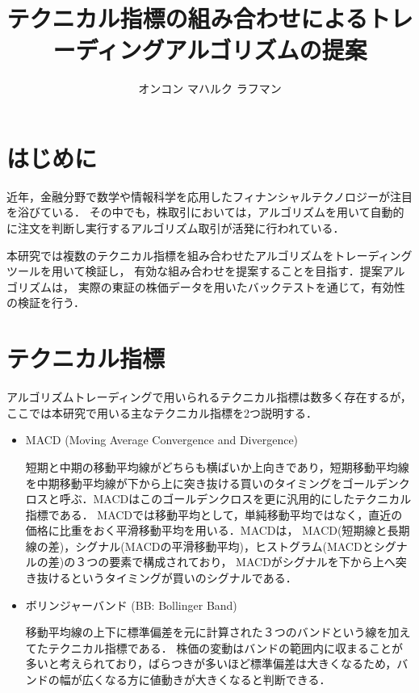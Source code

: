 \documentclass[dvipdfmx,a4paper,twocolumn,10pt]{jarticle}
\title{テクニカル指標の組み合わせによるトレーディングアルゴリズムの提案}%
\author{オンコン マハルク ラフマン}       %
\begin{document}
\maketitle

\section{はじめに}
近年，金融分野で数学や情報科学を応用したフィナンシャルテクノロジーが注目を浴びている．
その中でも，株取引においては，アルゴリズムを用いて自動的に注文を判断し実行するアルゴリズム取引が活発に行われている\cite{python_trade}．

本研究では複数のテクニカル指標を組み合わせたアルゴリズムをトレーディングツールを用いて検証し，
有効な組み合わせを提案することを目指す．提案アルゴリズムは，
実際の東証の株価データを用いたバックテストを通じて，有効性の検証を行う．

\section{テクニカル指標}
アルゴリズムトレーディングで用いられるテクニカル指標は数多く存在するが，ここでは本研究で用いる主なテクニカル指標を2つ説明する．

\begin{itemize}

    \item MACD (Moving Average Convergence and Divergence)
    
    短期と中期の移動平均線がどちらも横ばいか上向きであり，短期移動平均線を中期移動平均線が下から上に突き抜ける買いのタイミングをゴールデンクロスと呼ぶ．MACDはこのゴールデンクロスを更に汎用的にしたテクニカル指標である．
MACDでは移動平均として，単純移動平均ではなく，直近の価格に比重をおく平滑移動平均を用いる．MACDは，
MACD(短期線と長期線の差)，シグナル(MACDの平滑移動平均)，ヒストグラム(MACDとシグナルの差)の３つの要素で構成されており，
MACDがシグナルを下から上へ突き抜けるというタイミングが買いのシグナルである．
\end{itemize}
\begin{itemize}
  \item ボリンジャーバンド (BB: Bollinger Band)
  
  移動平均線の上下に標準偏差を元に計算された３つのバンドという線を加えてたテクニカル指標である．
株価の変動はバンドの範囲内に収まることが多いと考えられており，ばらつきが多いほど標準偏差は大きくなるため，バンドの幅が広くなる方に値動きが大きくなると判断できる．
\end{itemize}
\end{document}
